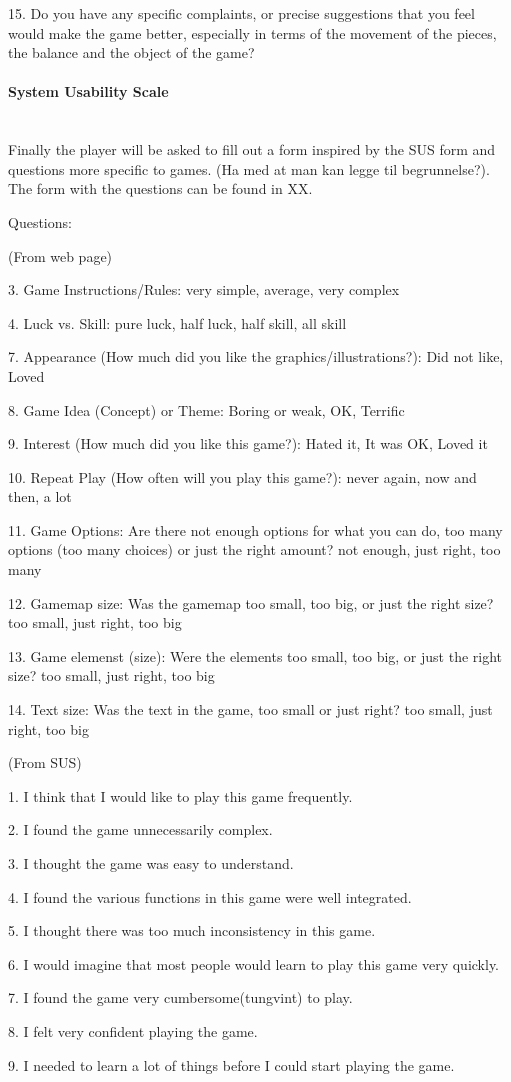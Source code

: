 15. Do you have any specific complaints, or precise suggestions that you feel would make the game better, especially in terms of the movement of the pieces, the balance and the object of the game?

\paragraph{System Usability Scale}\mbox{}\\

Finally the player will be asked to fill out a form inspired by the SUS form and questions more specific to games. (Ha med at man kan legge til begrunnelse?). The form with the questions can be found in XX.

Questions:

(From web page)



3. Game Instructions/Rules: very simple, average, very complex

4. Luck vs. Skill: pure luck, half luck, half skill, all skill

7. Appearance (How much did you like the graphics/illustrations?): Did not like, Loved

8. Game Idea (Concept) or Theme: Boring or weak, OK, Terrific

9. Interest (How much did you like this game?): Hated it, It was OK, Loved it

10. Repeat Play (How often will you play this game?): never again, now and then, a lot

11. Game Options:  Are there not enough options for what you can do, too many options (too many choices) or just the right amount? not enough, just right, too many

12. Gamemap size: Was the gamemap too small, too big, or just the right size? too small, just right, too big

13. Game elemenst (size): Were the elements too small, too big, or just the right size? too small, just right, too big

14. Text size: Was the text in the game, too small or just right? too small, just right, too big



(From SUS)

1. I think that I would like to play this game frequently.

2. I found the game unnecessarily complex.

3. I thought the game was easy to understand.

4. I found the various functions in this game were well integrated.

5. I thought there was too much inconsistency in this game.

6. I would imagine that most people would learn to play this game very quickly.

7. I found the game very cumbersome(tungvint) to play.

8. I felt very confident playing the game.

9. I needed to learn a lot of things before I could start playing the game.




